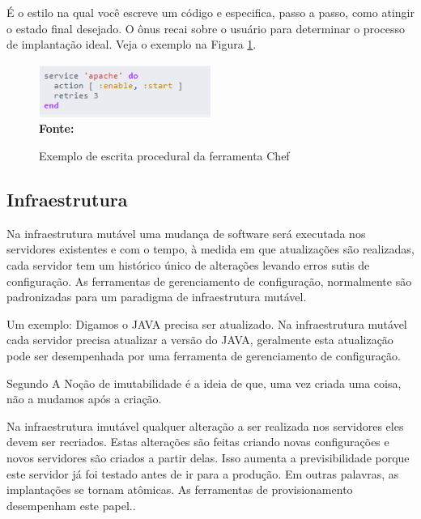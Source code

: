   
  É o estilo na qual você escreve um código e especifica, passo a passo, como atingir o estado final desejado. O ônus recai sobre o usuário para determinar o processo de implantação ideal. Veja o exemplo na Figura \ref{fig:figura1}.

\begin{figure}[ht]
	\centering	
	\caption[\hspace{0.1cm}Exemplo procedural]{Exemplo de escrita procedural da ferramenta Chef}
	\vspace{-0.4cm}
	\includegraphics[width=0.5\textwidth]{figuras/chef-io-exemplo-procedural.png}
	 \vspace{-0.2cm}
	\\\textbf{\footnotesize Fonte: \cite{chef01}}
	\label{fig:figura1}
\end{figure}
\vspace{-0.5cm}
  

 \subsection{Infraestrutura}
 
 Na infraestrutura mutável uma mudança de software será executada nos servidores existentes e com o tempo, à medida em que atualizações são realizadas, cada servidor tem um histórico único de alterações levando erros sutis de configuração. As ferramentas de gerenciamento de configuração, normalmente são padronizadas para um paradigma de infraestrutura mutável.
 
  Um exemplo: Digamos o JAVA precisa ser atualizado. Na infraestrutura mutável cada servidor precisa atualizar a versão do JAVA, geralmente esta atualização pode ser desempenhada por uma ferramenta de gerenciamento de configuração. 
 
  Segundo  A Noção de imutabilidade é a ideia de que, uma vez criada uma coisa, não a mudamos após a criação.
 
 Na infraestrutura imutável qualquer alteração a ser realizada nos servidores eles devem ser recriados. Estas alterações são feitas criando novas configurações e novos servidores são criados a partir delas. Isso aumenta a previsibilidade porque este servidor já foi testado antes de ir para a produção. Em outras palavras, as implantações se tornam atômicas. As ferramentas de provisionamento desempenham este papel.\cite{Morris:2016:ICM:3006361}.
 
